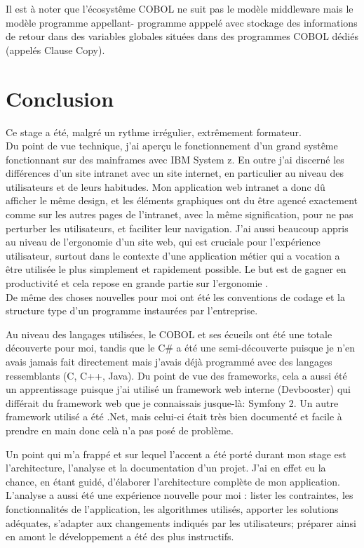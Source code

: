 \documentclass[a4paper,french,8pt]{article}
\begin{document}
			Il est à noter que l'écosystême COBOL ne suit pas le modèle middleware mais le modèle programme appellant- programme apppelé avec stockage des informations de retour dans des variables globales situées dans
			des programmes COBOL dédiés (appelés Clause Copy).
		
\section{Conclusion}


		Ce stage a été, malgré un rythme irrégulier, extrêmement formateur. \\
		
		
		Du point de vue technique, j'ai aperçu le fonctionnement d'un grand systême fonctionnant sur des mainframes avec IBM System z. 
		En outre j'ai discerné les différences d'un site intranet avec un site internet, en particulier au niveau des utilisateurs et de leurs habitudes. Mon application web intranet a donc dû afficher 
		le même design, et les éléments graphiques ont du être agencé exactement comme sur les autres pages de l'intranet, avec la même signification, pour ne pas perturber les utilisateurs, et faciliter leur navigation.
		J'ai aussi beaucoup appris au niveau de l'ergonomie d'un site web, qui est cruciale pour l'expérience utilisateur, surtout dans le contexte d'une application métier qui a vocation a être utilisée
		le plus simplement et rapidement possible. Le but est de gagner en productivité et cela repose en grande partie sur l'ergonomie .\\
		De même des choses nouvelles pour moi ont été les conventions de codage et la structure type d'un programme instaurées par l'entreprise.
		
		
		Au niveau des langages utilisées, le COBOL et ses écueils ont été une totale découverte pour moi, tandis que le C\# a été une semi-découverte puisque je n'en avais jamais fait directement mais 
		j'avais déjà programmé avec des langages ressemblants (C, C++, Java).
		Du point de vue des frameworks, cela a aussi été un apprentissage puisque j'ai utilisé un framework web interne (Devbooster) qui différait du framework web que je connaissais jusque-là: Symfony 2.
		Un autre framework utilisé a été .Net, mais celui-ci était très bien documenté et facile à prendre en main donc celà n'a pas posé de problème.
		
		Un point qui m'a frappé et sur lequel l'accent a été porté durant mon stage est l'architecture, l'analyse et la documentation d'un projet. J'ai en effet eu la chance, en étant guidé, d'élaborer
		l'architecture complète de mon application. L'analyse a aussi été une expérience nouvelle pour moi : lister les contraintes, les fonctionnalités de l'application, les algorithmes utilisés, apporter les solutions adéquates,
		s'adapter aux changements indiqués par les utilisateurs; préparer ainsi en amont le développement a été des plus instructifs.\\
		
\end{document}

